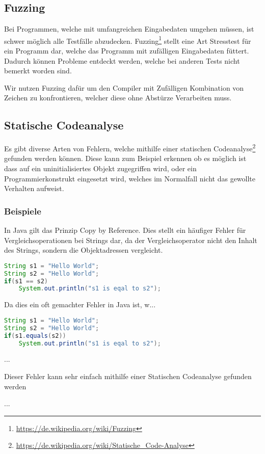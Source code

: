 \subsection{Fuzzing}

Bei Programmen, welche mit umfangreichen Eingabedaten umgehen m\"ussen, ist schwer m\"oglich alle Testf\"alle abzudecken. Fuzzing\footnote{\url{https://de.wikipedia.org/wiki/Fuzzing}} stellt eine Art Stresstest f\"ur ein Programm dar, welche das Programm mit zuf\"alligen Eingabedaten f\"uttert. Dadurch k\"onnen Probleme entdeckt werden, welche bei anderen Tests nicht bemerkt worden sind.

Wir nutzen Fuzzing daf\"ur um den Compiler mit Zuf\"alligen Kombination von Zeichen zu konfrontieren, welcher diese ohne Abst\"urze Verarbeiten muss.

\subsection{Statische Codeanalyse}

Es gibt diverse Arten von Fehlern, welche mithilfe einer statischen Codeanalyse\footnote{\url{https://de.wikipedia.org/wiki/Statische_Code-Analyse}} gefunden werden k\"onnen. Diese kann zum Beispiel erkennen ob es m\"oglich ist dass auf ein uninitialisiertes Objekt zugegriffen wird, oder ein Programmierkonstrukt eingesetzt wird, welches im Normalfall nicht das gewollte Verhalten aufweist.

\subsubsection{Beispiele}


In Java gilt das Prinzip Copy by Reference. Dies stellt ein h\"aufiger Fehler f\"ur Vergleichsoperationen bei Strings dar, da der Vergleichsoperator nicht den Inhalt des Strings, sondern die Objektadressen vergleicht.

\begin{lstlisting}[language=Java]
String s1 = "Hello World";
String s2 = "Hello World";
if(s1 == s2)
	System.out.println("s1 is eqal to s2");
\end{lstlisting}

Da dies ein oft gemachter Fehler in Java ist, w...

\begin{lstlisting}[language=Java]
String s1 = "Hello World";
String s2 = "Hello World";
if(s1.equals(s2))
	System.out.println("s1 is eqal to s2");
\end{lstlisting}


...

Dieser Fehler kann sehr einfach mithilfe einer Statischen Codeanalyse gefunden werden

...